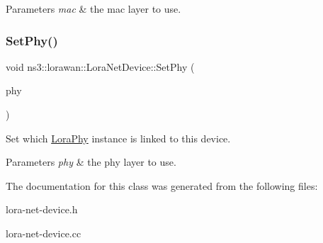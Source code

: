 \begin{DoxyParams}{Parameters}
{\em mac} & the mac layer to use. \\
\hline
\end{DoxyParams}
\mbox{\label{classns3_1_1lorawan_1_1LoraNetDevice_afa8040f91496fb57a2b09cdc56f45dab}} 
\subsubsection{\texorpdfstring{Set\+Phy()}{SetPhy()}}
{\footnotesize\ttfamily void ns3\+::lorawan\+::\+Lora\+Net\+Device\+::\+Set\+Phy (\begin{DoxyParamCaption}\item[{Ptr$<$ \hyperlink{classns3_1_1lorawan_1_1LoraPhy}{Lora\+Phy} $>$}]{phy }\end{DoxyParamCaption})}

Set which \hyperlink{classns3_1_1lorawan_1_1LoraPhy}{Lora\+Phy} instance is linked to this device.


\begin{DoxyParams}{Parameters}
{\em phy} & the phy layer to use. \\
\hline
\end{DoxyParams}


The documentation for this class was generated from the following files\+:\begin{DoxyCompactItemize}
\item 
lora-\/net-\/device.\+h\item 
lora-\/net-\/device.\+cc\end{DoxyCompactItemize}
